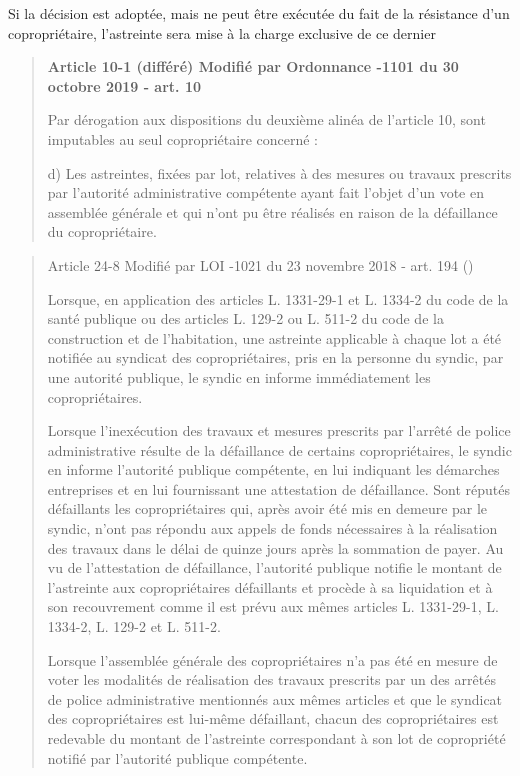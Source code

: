 				Si la décision est adoptée, mais ne peut être exécutée du fait de la résistance d’un copropriétaire, l’astreinte sera mise à la charge exclusive de ce dernier
				
				\begin{quote}
					\textbf{Article 10-1 (différé) Modifié par Ordonnance -1101 du 30 octobre 2019 - art. 10}
					
					Par dérogation aux dispositions du deuxième alinéa de l'article 10, sont imputables au seul copropriétaire concerné :
					
					d) Les astreintes, fixées par lot, relatives à des mesures ou travaux prescrits par l'autorité administrative compétente ayant fait l'objet d'un vote en assemblée générale et qui n'ont pu être réalisés en raison de la défaillance du copropriétaire.
				\end{quote}
				
				\begin{quote}
					Article 24-8 Modifié par LOI -1021 du 23 novembre 2018 - art. 194 (\V)
					
					Lorsque, en application des articles L. 1331-29-1 et L. 1334-2 du code de la santé publique ou des articles L. 129-2 ou L. 511-2 du code de la construction et de l'habitation, une astreinte applicable à chaque lot a été notifiée au syndicat des copropriétaires, pris en la personne du syndic, par une autorité publique, le syndic en informe immédiatement les copropriétaires.
					
					Lorsque l'inexécution des travaux et mesures prescrits par l'arrêté de police administrative résulte de la défaillance de certains copropriétaires, le syndic en informe l'autorité publique compétente, en lui indiquant les démarches entreprises et en lui fournissant une attestation de défaillance. Sont réputés défaillants les copropriétaires qui, après avoir été mis en demeure par le syndic, n'ont pas répondu aux appels de fonds nécessaires à la réalisation des travaux dans le délai de quinze jours après la sommation de payer. Au vu de l'attestation de défaillance, l'autorité publique notifie le montant de l'astreinte aux copropriétaires défaillants et procède à sa liquidation et à son recouvrement comme il est prévu aux mêmes articles L. 1331-29-1, L. 1334-2, L. 129-2 et L. 511-2.
					
					Lorsque l'assemblée générale des copropriétaires n'a pas été en mesure de voter les modalités de réalisation des travaux prescrits par un des arrêtés de police administrative mentionnés aux mêmes articles et que le syndicat des copropriétaires est lui-même défaillant, chacun des copropriétaires est redevable du montant de l'astreinte correspondant à son lot de copropriété notifié par l'autorité publique compétente.
				\end{quote}
			
